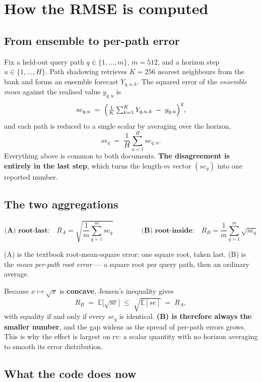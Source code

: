 \documentclass[11pt,a4paper]{article}
\begin{document}
\section{How the RMSE is computed}

\subsection{From ensemble to per-path error}

Fix a held-out query path $q \in \{1,\dots,m\}$, $m = 512$, and a horizon step
$u \in \{1,\dots,H\}$. Path shadowing retrieves $K = 256$ nearest neighbours
from the bank and forms an ensemble forecast $Y_{q,u,k}$. The squared error of
the \emph{ensemble mean} against the realised value $y_{q,u}$ is
\[
se_{q,u} \;=\; \Bigl(\tfrac{1}{K}\textstyle\sum_{k=1}^{K} Y_{q,u,k} \;-\; y_{q,u}\Bigr)^{2},
\]
and each path is reduced to a single scalar by averaging over the horizon,
\[
se_q \;=\; \frac{1}{H}\sum_{u=1}^{H} se_{q,u}.
\]
Everything above is common to both documents. \textbf{The disagreement is
entirely in the last step}, which turns the length-$m$ vector $(se_q)$ into one
reported number.

\subsection{The two aggregations}

\[
\textbf{(A) root-last:}\quad R_A=\sqrt{\frac{1}{m}\sum_{q=1}^{m} se_q}
\qquad\qquad
\textbf{(B) root-inside:}\quad R_B=\frac{1}{m}\sum_{q=1}^{m}\sqrt{se_q}
\]

(A) is the textbook root-mean-square error: one square root, taken last. (B) is
the \emph{mean per-path root error} --- a square root per query path, then an
ordinary average.

Because $x \mapsto \sqrt{x}$ is \textbf{concave}, Jensen's inequality gives
\[
R_B \;=\; \mathbb{E}\bigl[\sqrt{se}\bigr] \;\le\; \sqrt{\mathbb{E}[se]} \;=\; R_A ,
\]
with equality if and only if every $se_q$ is identical. \textbf{(B) is therefore
always the smaller number}, and the gap widens as the spread of per-path errors
grows. This is why the effect is largest on rv: a scalar quantity with no
horizon averaging to smooth its error distribution.

\subsection{What the code does now}
\end{document}

